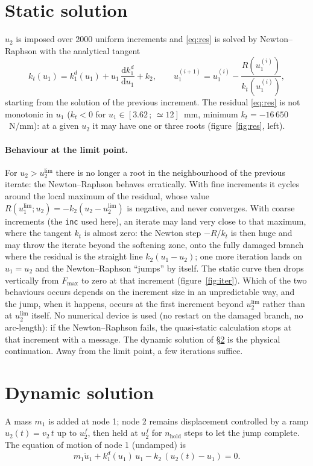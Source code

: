\documentclass[11pt,a4paper]{article}
\newcommand{\dd}{\mathrm{d}}
\newcommand{\kd}{k_1^{d}}
\begin{document}
\section{Static solution}
\label{sec:stat}
$u_2$ is imposed over 2000 uniform increments and \eqref{eq:res} is solved by Newton--Raphson
with the analytical tangent
\begin{equation}
  k_t(u_1) = \kd(u_1) + u_1\,\frac{\dd\kd}{\dd u_1} + k_2,\qquad
  u_1^{(i+1)} = u_1^{(i)} - \frac{R(u_1^{(i)})}{k_t(u_1^{(i)})},
\end{equation}
starting from the solution of the previous increment. The residual \eqref{eq:res} is not
monotonic in $u_1$ ($k_t<0$ for $u_1\in[3.62\,;\,\simeq12]$~mm, minimum $k_t = -16\,650$~N/mm): at
a given $u_2$ it may have one or three roots (figure~\ref{fig:res}, left).

\paragraph{Behaviour at the limit point.}
For $u_2 > u_2^{\lim}$ there is no longer a root in the neighbourhood of the previous iterate:
the Newton--Raphson behaves erratically. With fine increments it cycles around the local
maximum of the residual, whose value $R(u_1^{\lim};u_2) = -k_2(u_2-u_2^{\lim})$ is negative, and
never converges. With coarse increments (the \texttt{inc} used here), an iterate may land very
close to that maximum, where the tangent $k_t$ is almost zero: the Newton step $-R/k_t$ is then
huge and may throw the iterate beyond the softening zone, onto the fully damaged branch where
the residual is the straight line $k_2(u_1-u_2)$; one more iteration lands on $u_1 = u_2$ and the
Newton--Raphson ``jumps'' by itself. The static curve then drops vertically from $F_{\max}$ to
zero at that increment (figure~\ref{fig:iter}). Which of the two behaviours occurs depends on
the increment size in an unpredictable way, and the jump, when it happens, occurs at the first
increment beyond $u_2^{\lim}$ rather than at $u_2^{\lim}$ itself. No numerical device is used (no
restart on the damaged branch, no arc-length): if the Newton--Raphson fails, the quasi-static
calculation stops at that increment with a message. The dynamic solution of \S\ref{sec:dyn} is
the physical continuation. Away from the limit point, a few iterations suffice.

\section{Dynamic solution}
\label{sec:dyn}
A mass $m_1$ is added at node 1; node 2 remains displacement controlled by a ramp
$u_2(t)=v_2\,t$ up to $u_2^f$, then held at $u_2^f$ for $n_{\text{hold}}$ steps to let the jump
complete. The equation of motion of node 1 (undamped) is
\begin{equation}
  m_1\ddot u_1 + \kd(u_1)\,u_1 - k_2\,(u_2(t)-u_1) = 0 .
\end{equation}
\end{document}
